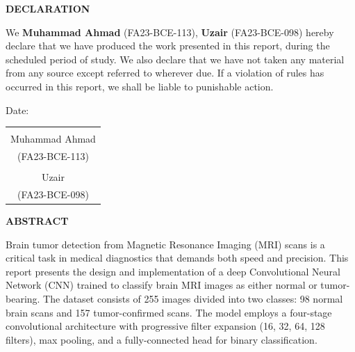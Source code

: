 \documentclass[12pt,a4paper]{article}
\begin{document}
\newpage
\begin{center}
    {\Large\textbf{DECLARATION}}
\end{center}

\noindent We \textbf{Muhammad Ahmad} (FA23-BCE-113), \textbf{Uzair} (FA23-BCE-098) hereby declare that we have produced the work presented in this report, during the scheduled period of study. We also declare that we have not taken any material from any source except referred to wherever due. If a violation of rules has occurred in this report, we shall be liable to punishable action.

\vspace{1cm}

\noindent Date:\underline{\hspace{6cm}}

\vspace{1cm}

\begin{flushright}
\begin{tabular}{c}
\underline{\hspace{4cm}} \\
Muhammad Ahmad \\
(FA23-BCE-113) \\[0.8cm]
\underline{\hspace{4cm}} \\
Uzair \\
(FA23-BCE-098)
\end{tabular}
\end{flushright}

\vspace{2cm}

\newpage
\begin{center}
    {\Large\textbf{ABSTRACT}}
\end{center}

Brain tumor detection from Magnetic Resonance Imaging (MRI) scans is a critical task in medical diagnostics that demands both speed and precision. This report presents the design and implementation of a deep Convolutional Neural Network (CNN) trained to classify brain MRI images as either normal or tumor-bearing. The dataset consists of 255 images divided into two classes: 98 normal brain scans and 157 tumor-confirmed scans. The model employs a four-stage convolutional architecture with progressive filter expansion (16, 32, 64, 128 filters), max pooling, and a fully-connected head for binary classification.
\end{document}
